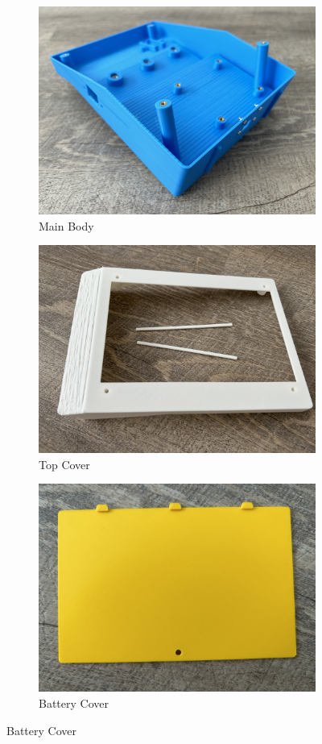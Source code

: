 \begin{figure}[!ht]
    \centering
    \begin{subfigure}[c]{0.45\textwidth}
        \begin{minipage}{\textwidth}
            \centering
            \includegraphics[height=4 cm]{texs/Part1/chapter5/image/res_main.jpg}
        \end{minipage}
        \caption{Main Body}
        \label{fig:printed_main_body}
    \end{subfigure}
    \begin{subfigure}[c]{0.45\textwidth}
        \begin{minipage}{\textwidth}
            \centering
            \includegraphics[height=4 cm]{texs/Part1/chapter5/image/res_top.jpg}
        \end{minipage}
        \caption{Top Cover}
        \label{fig:printed_top_cover}
    \end{subfigure}
    \begin{subfigure}[c]{0.45\textwidth}
        \begin{minipage}{\textwidth}
            \centering
            \includegraphics[height=4 cm]{texs/Part1/chapter5/image/res_batt.jpg}
        \end{minipage}
        \caption{Battery Cover}

\end{subfigure}
\end{figure}

